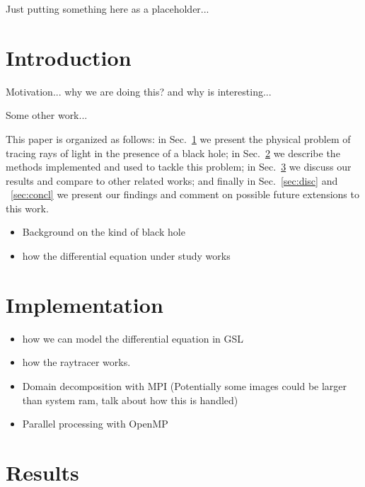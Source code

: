 Just putting something here as a placeholder...



\section{Introduction}
\label{sec:intro}



Motivation... why we are doing this? and why is interesting...

Some other work... \cite{sharma2023mahakalapythonbasedmodularraytracing,James_2015}

This paper is organized as follows:
in Sec.~\ref{sec:intro} we present the physical problem of tracing rays of light in the presence of a black hole;
in Sec.~\ref{sec:impl} we describe the methods implemented and used to tackle this problem;
in Sec.~\ref{sec:results} we discuss our results and compare to other related works;
and finally in Sec.~\ref{sec:disc} and ~\ref{sec:concl} we present our findings and comment
on possible future extensions to this work.


\begin{itemize}
	\item Background on the kind of black hole
	\item how the differential equation under study works
\end{itemize}



\section{Implementation}
\label{sec:impl}

\begin{itemize}
	\item how we can model the differential equation in GSL
    	\item how the raytracer works.
    	\item Domain decomposition with MPI (Potentially some images could be larger than system ram, talk about how this is handled)
    	\item Parallel processing with OpenMP
\end{itemize}


\section{Results}
\label{sec:results}

